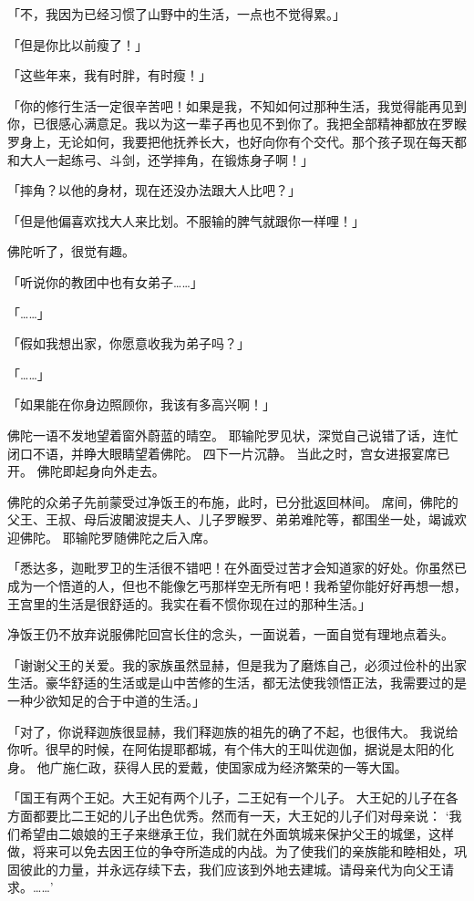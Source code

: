 \documentclass[twoside,openany]{book}
\begin{document}
「不，我因为已经习惯了山野中的生活，一点也不觉得累。」

「但是你比以前瘦了！」

「这些年来，我有时胖，有时瘦！」

「你的修行生活一定很辛苦吧！如果是我，不知如何过那种生活，我觉得能再见到你，已很感心满意足。我以为这一辈子再也见不到你了。我把全部精神都放在罗睺罗身上，无论如何，我要把他抚养长大，也好向你有个交代。那个孩子现在每天都和大人一起练弓、斗剑，还学摔角，在锻炼身子啊！」

「摔角？以他的身材，现在还没办法跟大人比吧？」

「但是他偏喜欢找大人来比划。不服输的脾气就跟你一样哩！」

佛陀听了，很觉有趣。

「听说你的教团中也有女弟子……」

「……」

「假如我想出家，你愿意收我为弟子吗？」

「……」

「如果能在你身边照顾你，我该有多高兴啊！」

佛陀一语不发地望着窗外蔚蓝的晴空。
耶输陀罗见状，深觉自己说错了话，连忙闭口不语，并睁大眼睛望着佛陀。
四下一片沉静。
当此之时，宫女进报宴席已开。
佛陀即起身向外走去。

佛陀的众弟子先前蒙受过净饭王的布施，此时，已分批返回林间。
席间，佛陀的父王、王叔、母后波闍波提夫人、儿子罗睺罗、弟弟难陀等，都围坐一处，竭诚欢迎佛陀。
耶输陀罗随佛陀之后入席。

「悉达多，迦毗罗卫的生活很不错吧！在外面受过苦才会知道家的好处。你虽然已成为一个悟道的人，但也不能像乞丐那样空无所有吧！我希望你能好好再想一想，王宫里的生活是很舒适的。我实在看不惯你现在过的那种生活。」

净饭王仍不放弃说服佛陀回宫长住的念头，一面说着，一面自觉有理地点着头。

「谢谢父王的关爱。我的家族虽然显赫，但是我为了磨炼自己，必须过俭朴的出家生活。豪华舒适的生活或是山中苦修的生活，都无法使我领悟正法，我需要过的是一种少欲知足的合于中道的生活。」

「对了，你说释迦族很显赫，我们释迦族的祖先的确了不起，也很伟大。
我说给你听。很早的时候，在阿佑提耶都城，有个伟大的王叫优迦伽，据说是太阳的化身。
他广施仁政，获得人民的爱戴，使国家成为经济繁荣的一等大国。

「国王有两个王妃。大王妃有两个儿子，二王妃有一个儿子。
大王妃的儿子在各方面都要比二王妃的儿子出色优秀。然而有一天，大王妃的儿子们对母亲说：
‘我们希望由二娘娘的王子来继承王位，我们就在外面筑城来保护父王的城堡，这样做，将来可以免去因王位的争夺所造成的内战。为了使我们的亲族能和睦相处，巩固彼此的力量，并永远存续下去，我们应该到外地去建城。请母亲代为向父王请求。……’
\end{document}
